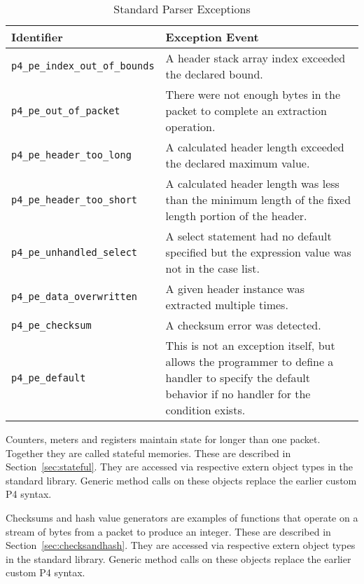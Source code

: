 \documentclass[12pt]{article}
\begin{document}
\begin{table}[H]
\begin{center}
\begin{tabular}{| l | p{} |} \hline
\textbf{Identifier} &
\textbf{Exception Event} \\ \hline
\texttt{p4_pe_index_out_of_bounds} &
A header stack array index exceeded the declared bound. \\ \hline
\texttt{p4_pe_out_of_packet} &
There were not enough bytes in the packet to complete an extraction operation. \\ \hline
\texttt{p4_pe_header_too_long} &
A calculated header length exceeded the declared maximum value. \\ \hline
\texttt{p4_pe_header_too_short} &
A calculated header length was less than the minimum length of the fixed length 
portion of the header. \\ \hline
\texttt{p4_pe_unhandled_select} &
A select statement had no default specified but the expression value was not 
in the case list. \\ \hline
\texttt{p4_pe_data_overwritten} &
A given header instance was extracted multiple times. \\ \hline
\texttt{p4_pe_checksum} &
A checksum error was detected. \\ \hline
\texttt{p4_pe_default} &
This is not an exception itself, but allows the programmer to define a handler 
to specify the default behavior if no handler for the condition exists. \\
\hline
\end{tabular}
\end{center}
\caption{Standard Parser Exceptions}
\label{tab:parserexceptions}
\end{table}


Counters, meters and registers maintain state for longer than one packet. 
Together they are called stateful memories.  These are described in
Section~\ref{sec:stateful}.  They are accessed via respective extern
object types in the standard library.  Generic method calls on these objects
replace the earlier custom P4 syntax.


Checksums and hash value generators are examples of functions that operate on a
stream of bytes from a packet to produce an integer.  These are described
in Section~\ref{sec:checksandhash}.   They are accessed via respective extern
object types in the standard library.  Generic method calls on these objects
replace the earlier custom P4 syntax.
\end{document}
